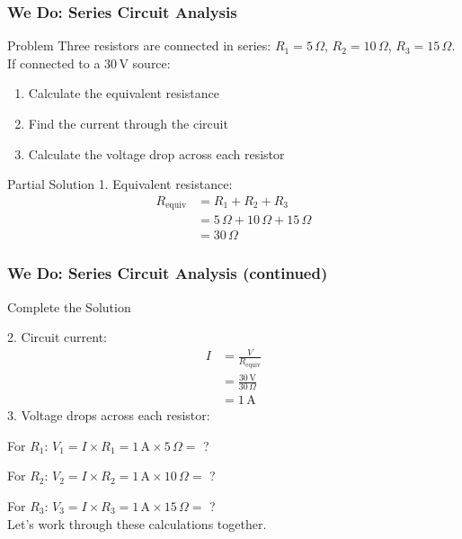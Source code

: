 \documentclass{beamer}
\begin{document}
\begin{frame}
\frametitle{We Do: Series Circuit Analysis}
\begin{exampleblock}{Problem}
Three resistors are connected in series: $R_1 = 5 \, \Omega$, $R_2 = 10 \, \Omega$, $R_3 = 15 \, \Omega$. If connected to a $30 \, \text{V}$ source:
\begin{enumerate}
\item Calculate the equivalent resistance
\item Find the current through the circuit
\item Calculate the voltage drop across each resistor
\end{enumerate}
\end{exampleblock}

\begin{block}{Partial Solution}
1. Equivalent resistance:
\begin{align}
R_{\text{equiv}} &= R_1 + R_2 + R_3 \\
&= 5 \, \Omega + 10 \, \Omega + 15 \, \Omega \\
&= 30 \, \Omega
\end{align}


\end{block}
\end{frame}

\begin{frame}
\frametitle{We Do: Series Circuit Analysis (continued)}
\begin{block}{Complete the Solution}


2. Circuit current:
\begin{align}
I &= \frac{V}{R_{\text{equiv}}} \\
&= \frac{30 \, \text{V}}{30 \, \Omega} \\
&= 1 \, \text{A}
\end{align}
3. Voltage drops across each resistor:

For $R_1$: $V_1 = I \times R_1 = 1 \, \text{A} \times 5 \, \Omega = $ ?

For $R_2$: $V_2 = I \times R_2 = 1 \, \text{A} \times 10 \, \Omega = $ ?

For $R_3$: $V_3 = I \times R_3 = 1 \, \text{A} \times 15 \, \Omega = $ ?
\\
Let's work through these calculations together.
\end{block}


\end{frame}
\end{document}
